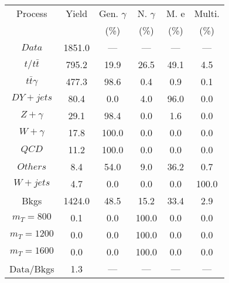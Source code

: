 \begin{figure}
\begin{minipage}[c]{0.32\textwidth}
{\begin{tabular}{cccccc}
\hline
Process & Yield & Gen. $\gamma$ & N. $\gamma$ & M. e & Multi. \\
 &  & (\%) & (\%) & (\%) & (\%)  \\
\hline
                                                                      $ Data $ &  1851.0 &  --- &  --- &  --- &  ---\\
$ t/t\bar{t} $ &  795.2 &  19.9 &  26.5 &  49.1 &  4.5\\
$ t\bar{t}\gamma $ &  477.3 &  98.6 &  0.4 &  0.9 &  0.1\\
$ DY+jets $ &  80.4 &  0.0 &  4.0 &  96.0 &  0.0\\
$ Z+\gamma $ &  29.1 &  98.4 &  0.0 &  1.6 &  0.0\\
$ W+\gamma $ &  17.8 &  100.0 &  0.0 &  0.0 &  0.0\\
$ QCD $ &  11.2 &  100.0 &  0.0 &  0.0 &  0.0\\
$ Others $ &  8.4 &  54.0 &  9.0 &  36.2 &  0.7\\
$ W+jets $ &  4.7 &  0.0 &  0.0 &  0.0 &  100.0\\
Bkgs &  1424.0 &  48.5 &  15.2 &  33.4 &  2.9\\
$ m_{T} = 800 $ &  0.1 &  0.0 &  100.0 &  0.0 &  0.0\\
$ m_{T} = 1200 $ &  0.0 &  0.0 &  100.0 &  0.0 &  0.0\\
$ m_{T} = 1600 $ &  0.0 &  0.0 &  100.0 &  0.0 &  0.0\\
Data/Bkgs &  1.3 &  --- &  --- &  --- &  ---\\
\hline
\end{tabular}
}
\end{minipage}
\end{figure}

